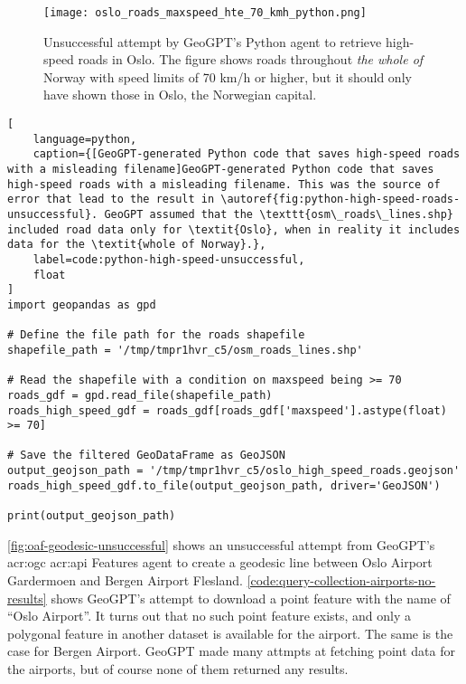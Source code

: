 \begin{figure}[htbp]
    \centering
    \texttt{[image: oslo\_roads\_maxspeed\_hte\_70\_kmh\_python.png]}
    \caption[Unsuccessful attempt by GeoGPT's Python agent to retrieve high-speed roads in Oslo]{Unsuccessful attempt by GeoGPT's Python agent to retrieve high-speed roads in Oslo. The figure shows roads throughout \textit{the whole of} Norway with speed limits of 70 km/h or higher, but it should only have shown those in Oslo, the Norwegian capital.}
    \label{fig:python-high-speed-roads-unsuccessful}
\end{figure}

\FloatBarrier

\begin{lstlisting}[
    language=python,
    caption={[GeoGPT-generated Python code that saves high-speed roads with a misleading filename]GeoGPT-generated Python code that saves high-speed roads with a misleading filename. This was the source of error that lead to the result in \autoref{fig:python-high-speed-roads-unsuccessful}. GeoGPT assumed that the \texttt{osm\_roads\_lines.shp} included road data only for \textit{Oslo}, when in reality it includes data for the \textit{whole of Norway}.},
    label=code:python-high-speed-unsuccessful,
    float
]
import geopandas as gpd

# Define the file path for the roads shapefile
shapefile_path = '/tmp/tmpr1hvr_c5/osm_roads_lines.shp'

# Read the shapefile with a condition on maxspeed being >= 70
roads_gdf = gpd.read_file(shapefile_path)
roads_high_speed_gdf = roads_gdf[roads_gdf['maxspeed'].astype(float) >= 70]

# Save the filtered GeoDataFrame as GeoJSON
output_geojson_path = '/tmp/tmpr1hvr_c5/oslo_high_speed_roads.geojson'
roads_high_speed_gdf.to_file(output_geojson_path, driver='GeoJSON')

print(output_geojson_path)
\end{lstlisting}

\FloatBarrier

\autoref{fig:oaf-geodesic-unsuccessful} shows an unsuccessful attempt from GeoGPT's \acrshort{acr:ogc} \acrshort{acr:api} Features agent to create a geodesic line between Oslo Airport Gardermoen and Bergen Airport Flesland. \autoref{code:query-collection-airports-no-results} shows GeoGPT's attempt to download a point feature with the name of \enquote{Oslo Airport}. It turns out that no such point feature exists, and only a polygonal feature in another dataset is available for the airport. The same is the case for Bergen Airport. GeoGPT made many attmpts at fetching point data for the airports, but of course none of them  returned any results.

